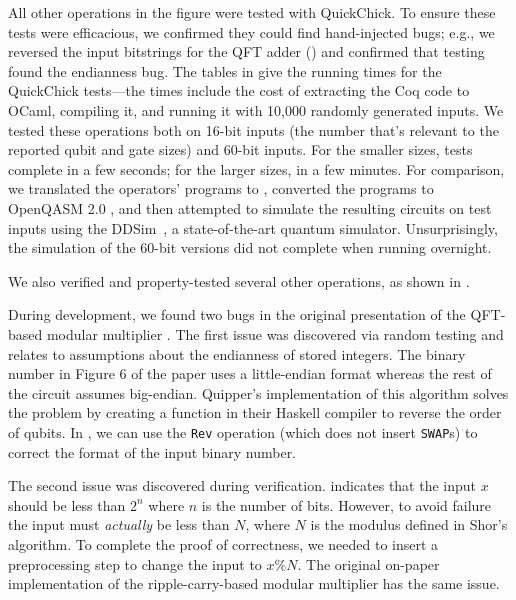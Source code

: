 All other operations in the figure were tested with Quick\-Chick. To
ensure these tests were efficacious, we confirmed they could find
hand-injected bugs; e.g., we reversed the input bitstrings for the QFT
adder () and confirmed that testing found
the endianness bug.  The tables in  give the
running times for the QuickChick tests---the times include the cost of
extracting the Coq code to OCaml, compiling it, and running it with
10,000 randomly generated inputs. We tested these operations both on
16-bit inputs (the number that's relevant to the reported qubit and
gate sizes) and 60-bit inputs. For the smaller sizes, tests complete
in a few seconds; for the larger sizes, in a few minutes. For
comparison, we translated the operators' \vqir programs to \sqir,
converted the \sqir programs to OpenQASM 2.0 \cite{Cross2017}, and
then attempted to simulate the resulting circuits on test inputs using
the DDSim~\cite{ddsim}, a state-of-the-art quantum simulator. Unsurprisingly, the simulation
of the 60-bit versions did not complete when running overnight. 

We also verified and property-tested several other operations, as
shown in .

During development, we found two bugs in the original presentation of the QFT-based modular multiplier \cite{qft-adder}. The first issue was discovered via random testing and relates to assumptions about the endianness of stored integers. The binary number in Figure 6 of the paper uses a little-endian format whereas the rest of the circuit assumes big-endian.
Quipper's implementation of this algorithm solves the problem by creating a function in their Haskell compiler to reverse the order of qubits. 
In \vqir, we can use the \texttt{Rev} operation (which does not insert \texttt{SWAP}s) to correct the format of the input binary number.

The second issue was discovered during verification. \citet{qft-adder} indicates that the input $x$ should be less than $2^n$ where $n$ is the number of bits. However, to avoid failure the input must \emph{actually} be less than $N$, where $N$ is the modulus defined in Shor's algorithm. To complete the proof of correctness, we needed to insert a preprocessing step to change the input to $x \% N$. 
The original on-paper implementation of the ripple-carry-based modular multiplier \cite{ripple-carry-mod} has the same issue. 

